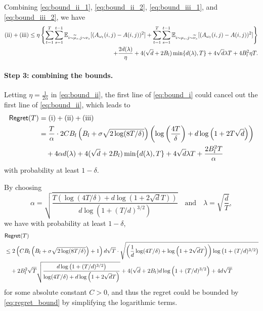 Combining \eqref{eq:bound_ii_1}, \eqref{eq:bound_ii_2}, \eqref{eq:bound_iii_1}, and \eqref{eq:bound_iii_2}, we have \begin{align}\label{eq:bound_ii}
    \text{(ii)}+\text{(iii)}\leq  
    \eta \left\{\sum_{t=1}^T \sum_{s=1}^{t-1} \E_{i\sim\widetilde{\mu}_s,j\sim\nu_s} [(A_{\omega_t}(i,j)-A(i,j))^2] + \sum_{t=1}^T \sum_{s=1}^{t-1} \E_{i\sim\mu_s,j\sim\widetilde{\nu}_s} [(A_{\omega_t}(i,j)-A(i,j))^2]\right\}\notag\\%
    +\frac{2d(\lambda)}{\eta} +4(\sqrt{d}+2B_l) \min\{d(\lambda),T\} +4\sqrt{d} \lambda T + 4B_l^2\eta T.
\end{align}



\paragraph{Step 3: combining the bounds.} 
Letting $\eta=\frac{1}{2\alpha}$ in \eqref{eq:bound_ii}, the first line of \eqref{eq:bound_i} could cancel out the first line of \eqref{eq:bound_ii}, which leads to
\begin{align}
    \mathsf{Regret}(T) &= \text{(i)}+\text{(ii)}+\text{(iii)}\notag\\
    &= \frac{T}{\alpha}\cdot2C B_l\left(B_l+\sigma\sqrt{2\log(8T/\delta)}\right)  \left(\log\left(\frac{4T}{\delta}\right)+d\log\left(1+2T\sqrt{d}\right)\right)\notag\\
    &\quad + 4\alpha d(\lambda) +4(\sqrt{d}+2B_l) \min\{d(\lambda),T\} +4\sqrt{d} \lambda T + \frac{2B_l^2T}{\alpha}
\end{align}
with probability at least $1-\delta$.

By choosing
$$\alpha=\sqrt{\frac{T\left(\log(4T/\delta)+d\log\left(1+2\sqrt{d}T\right)\right)}{d\log\left(1+(T/d)^{3/2}\right)}}\quad\text{and}\quad \lambda=\sqrt{\frac{d}{T}},$$
we have with probability at least $1-\delta$,
\begin{align}\label{eq:regret_bd_complete}
    &\mathsf{Regret}(T)\notag\\ &\leq  
2\left(CB_l\left(B_l+\sigma\sqrt{2\log(8T/\delta)}\right)+1\right)d\sqrt{T}\cdot\sqrt{\left(\frac{1}{d}\log(4T/\delta)+\log\left(1+2\sqrt{d}T\right)\right)\log\left(1+(T/d)^{3/2}\right)}\notag\\
    &\quad+ 2B_l^2\sqrt{T}\sqrt{\frac{d\log\left(1+(T/d)^{3/2}\right)}{\log(4T/\delta)+d\log\left(1+2\sqrt{d}T\right)}}+4(\sqrt{d}+2B_l) d\log\left(1+(T/d)^{3/2}\right)+4d\sqrt{T}
\end{align}
for some absolute constant $C>0$,
and thus the regret could be bounded by \eqref{eq:regret_bound} by simplifying the logarithmic terms.


